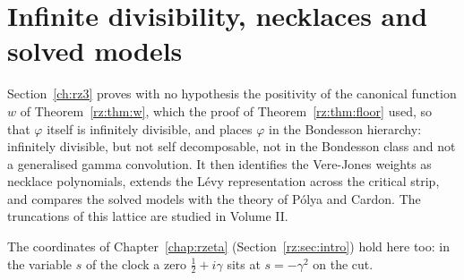 \chapter{Infinite divisibility, necklaces and solved models}\label{chap:rzid}

Section~\ref{ch:rz3} proves with no hypothesis the positivity of the canonical function $w$ of Theorem~\ref{rz:thm:w}, which the proof of Theorem~\ref{rz:thm:floor} used, so that $\varphi$ itself is infinitely divisible, and places $\varphi$ in the Bondesson hierarchy: infinitely divisible, but not self decomposable, not in the Bondesson class and not a generalised gamma convolution. It then identifies the Vere-Jones weights as necklace polynomials, extends the L\'evy representation across the critical strip, and compares the solved models with the theory of P\'olya and Cardon. The truncations of this lattice are studied in Volume II.

The coordinates of Chapter~\ref{chap:rzeta} (Section~\ref{rz:sec:intro}) hold here too: in the variable $s$ of the clock a zero $\frac12+i\gamma$ sits at $s=-\gamma^2$ on the cut.
